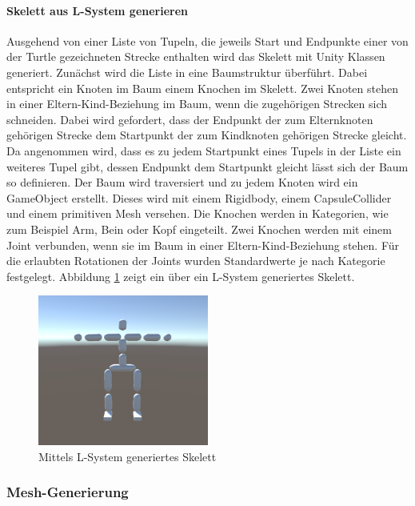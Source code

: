 \paragraph*{Skelett aus L-System generieren}
Ausgehend von einer Liste von Tupeln, die jeweils Start und Endpunkte einer von der Turtle gezeichneten Strecke enthalten wird das Skelett mit Unity Klassen generiert. Zunächst wird die Liste in eine Baumstruktur überführt. Dabei entspricht ein Knoten im Baum einem Knochen im Skelett. Zwei Knoten stehen in einer Eltern-Kind-Beziehung im Baum, wenn die zugehörigen Strecken sich schneiden. Dabei wird gefordert, dass der Endpunkt der zum Elternknoten gehörigen Strecke dem Startpunkt der zum Kindknoten gehörigen Strecke gleicht. Da angenommen wird, dass es zu jedem Startpunkt eines Tupels in der Liste ein weiteres Tupel gibt, dessen Endpunkt dem Startpunkt gleicht lässt sich der Baum so definieren. Der Baum wird traversiert und zu jedem Knoten wird ein GameObject erstellt.  Dieses wird mit einem Rigidbody, einem CapsuleCollider und einem primitiven Mesh versehen. Die Knochen werden in Kategorien, wie zum Beispiel Arm, Bein oder Kopf eingeteilt. Zwei Knochen werden mit einem Joint verbunden, wenn sie im Baum in einer Eltern-Kind-Beziehung stehen. Für die erlaubten Rotationen der Joints wurden Standardwerte je nach Kategorie festgelegt. Abbildung \ref{skeletonlsystemex} zeigt ein über ein L-System generiertes Skelett.

\begin{figure}[h]
	\begin{center}
		\includegraphics[width = 0.5\textwidth]{resources/img/skeletonlsystemex.png}
	\end{center}
	\caption{Mittels L-System generiertes Skelett}
	\label{skeletonlsystemex}
\end{figure}


\subsubsection{Mesh-Generierung}
